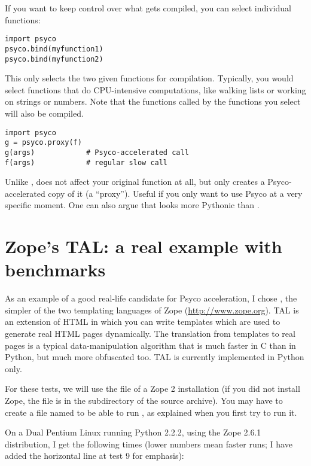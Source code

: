 \documentclass{manual}
\begin{document}
If you want to keep control over what gets compiled, you can select individual functions:

\begin{verbatim}
import psyco
psyco.bind(myfunction1)
psyco.bind(myfunction2)
\end{verbatim}

This only selects the two given functions for compilation. Typically, you would select functions that do CPU-intensive computations, like walking lists or working on strings or numbers.  Note that the functions called by the functions you select will also be compiled.

\begin{verbatim}
import psyco
g = psyco.proxy(f)
g(args)            # Psyco-accelerated call
f(args)            # regular slow call
\end{verbatim}

Unlike ,  does not affect your original function at all, but only creates a Psyco-accelerated copy of it (a ``proxy'').  Useful if you only want to use Psyco at a very specific moment.  One can also argue that  looks more Pythonic than .


\section{Zope's TAL: a real example with benchmarks}

As an example of a good real-life candidate for Psyco acceleration, I chose , the simpler of the two templating languages of Zope (\url{http://www.zope.org}).  TAL is an extension of HTML in which you can write templates which are used to generate real HTML pages dynamically.  The translation from templates to real pages is a typical data-manipulation algorithm that is much faster in C than in Python, but much more obfuscated too.  TAL is currently implemented in Python only.

For these tests, we will use the file  of a Zope 2 installation (if you did not install Zope, the file is in the  subdirectory of the source archive).  You may have to create a file named  to be able to run , as explained when you first try to run it.

On a Dual Pentium Linux running Python 2.2.2, using the Zope 2.6.1 distribution, I get the following times (lower numbers mean faster runs; I have added the horizontal line at test 9 for emphasis):
\end{document}
